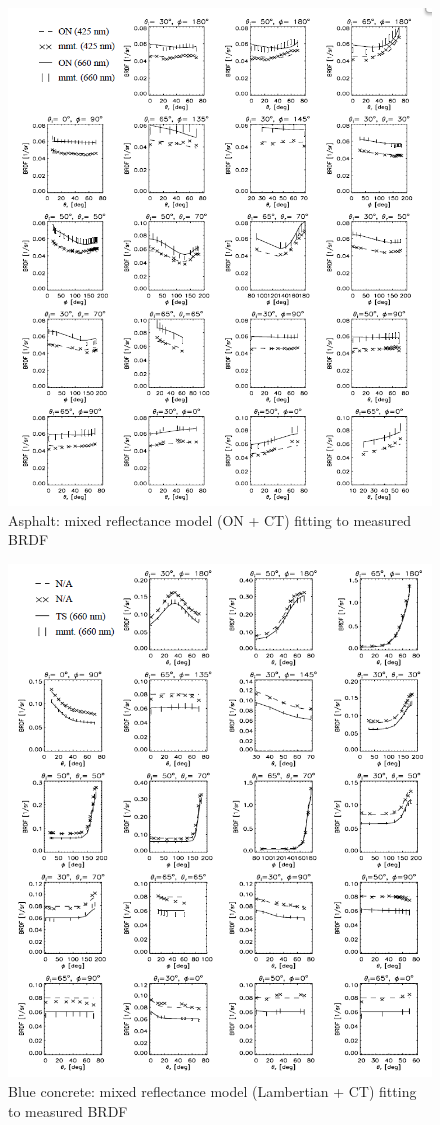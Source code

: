 \begin{figure}[!tb]
    \centering
    \includegraphics[width=0.9\linewidth]{./figures/measurement-literature/ON-fitting-asphalt.png}
    \caption{Asphalt: mixed reflectance model (ON + CT) fitting to measured BRDF}
    \label{fig:ON-fitting-asphalt}
\end{figure}

\begin{figure}[!tb]
    \centering
    \includegraphics[width=0.9\linewidth]{./figures/measurement-literature/CT-fitting-blue-concrete.png}
    \caption{Blue concrete: mixed reflectance model (Lambertian + CT) fitting to measured BRDF}
    \label{fig:CT-fitting-blue-concrete}
\end{figure}

